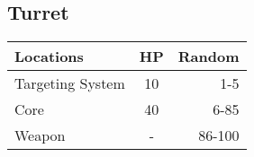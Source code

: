 \subsection{Turret}
\begin{minipage}{\textwidth/2}
	\begin{tabularx}{\textwidth}{|X|c|r|}
		\hline
		Locations & HP & Random\\
		\hline
		Targeting System & 10 & 1-5\\
		\hline
		Core & 40 & 6-85\\
		\hline
		Weapon & - & 86-100\\
		\hline
	\end{tabularx}
\end{minipage}

